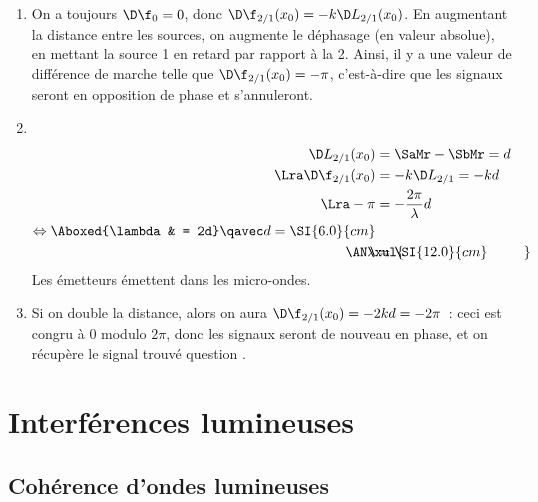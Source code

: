 \documentclass[../../main/main.tex]{subfiles}
\begin{document}
\begin{tcb*}[breakable]
{\begin{enumerate}[label=\sqenumi]
			\item On a toujours $\D\f_0 = 0$, donc $\D\f_{2/1}(x_0) = -k\D
				      L_{2/1}(x_0)$. En augmentant la distance entre les sources, on
			      augmente le déphasage (en valeur absolue), en mettant la source 1 en
			      retard par rapport à la 2. Ainsi, il y a une valeur de différence de
			      marche telle que $\D\f_{2/1}(x_0) = -\pi$, c'est-à-dire que les
			      signaux seront en opposition de phase et s'annuleront.
			\item ~
			      \vspace{-24pt}
			      \begin{align*}
				      \D L_{2/1}(x_0) & = \SaMr - \SbMr = d
				      \\ \Lra
				      \D\f_{2/1}(x_0) & = -k\D L_{2/1} = -kd
				      \\ \Lra
				      -\pi            & = - \frac{2\pi}{\lambda}d \\
				      \Leftrightarrow
				      \Aboxed{\lambda & = 2d}
				      \qavec
				      d = \SI{6.0}{cm}
				      \\
				      \AN
				      \makebox[0pt][l]{$\xul{\phantom{\lambda = \SI{12.0}{cm}}}$}
				      \lambda         & = \SI{12.0}{cm}
			      \end{align*}
			      Les émetteurs émettent dans les micro-ondes.
			\item Si on double la distance, alors on aura $\D\f_{2/1}(x_0) = -2kd =
				      -2\pi$~: ceci est congru à 0 modulo $2\pi$, donc les signaux
			      seront de nouveau en phase, et on récupère le signal trouvé
			      question
			      .
		\end{enumerate}
	}
	\vspace{-15pt}
\end{tcb*}

\section{Interférences lumineuses}
\subsection{Cohérence d'ondes lumineuses}
\end{document}
